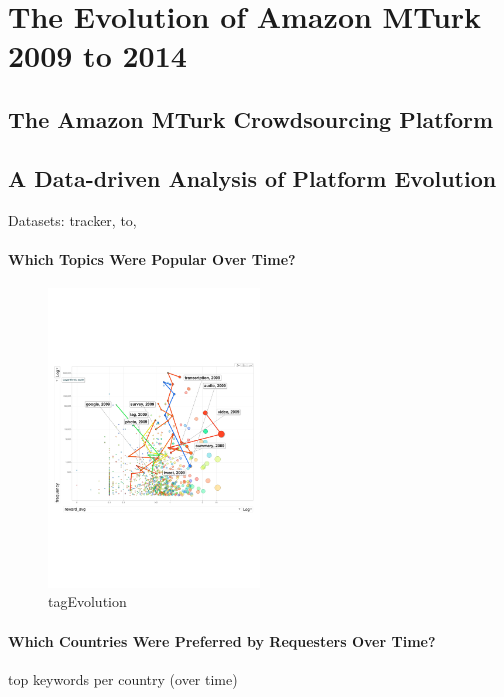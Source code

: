 \section{The Evolution of Amazon MTurk 2009 to 2014}\label{sec:stats}

\subsection{The Amazon MTurk Crowdsourcing Platform}


\subsection{A Data-driven Analysis of Platform Evolution}
Datasets: tracker, to, 
\paragraph{Which Topics Were Popular Over Time?}

\begin{figure}[htbp]
	\centering
		\includegraphics[width=0.5\textwidth]{figures/tagEvolution}
	\caption{tagEvolution}
	\label{fig:tagEvolution}
\end{figure}

\paragraph{Which Countries Were Preferred by Requesters Over Time?}
top keywords per country (over time)

